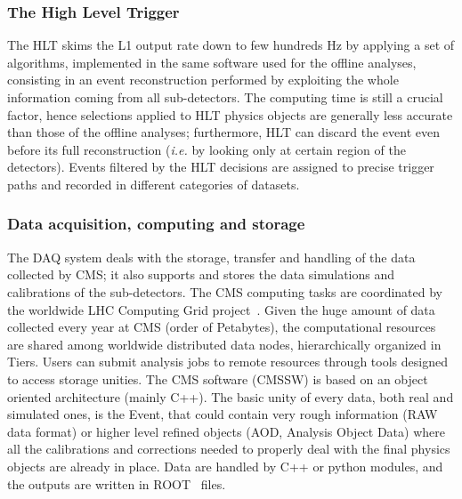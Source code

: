 \subsubsection{The High Level Trigger}
The HLT skims the L1 output rate down to few hundreds Hz by applying a set of algorithms, implemented in the same software used for the offline analyses, consisting in an event reconstruction performed by exploiting the whole information coming from all sub-detectors. The computing time is still a crucial factor, hence selections applied to HLT physics objects are generally less accurate than those of the offline analyses; furthermore, HLT can discard the event even before its full reconstruction (\textit{i.e.} by looking only at certain region of the detectors). Events filtered by the HLT decisions are assigned to precise trigger paths and recorded in different categories of datasets.

\subsubsection{Data acquisition, computing and storage}
The DAQ system deals with the storage, transfer and handling of the data collected by CMS; it also supports and stores the data simulations and calibrations of the sub-detectors. 
The CMS computing tasks are coordinated by the worldwide LHC Computing Grid project~\cite{2007CoPhC.177..219S}. Given the huge amount of data collected every year at CMS (order of Petabytes), the computational resources are shared among worldwide distributed data nodes, hierarchically organized in Tiers. Users can submit analysis jobs to remote resources through tools designed to access storage unities. 
The CMS software (CMSSW) is based on an object oriented architecture (mainly C++). The basic unity of every data, both real and simulated ones, is the Event, that could contain very rough information (RAW data format) or higher level refined objects (AOD, Analysis Object Data) where all the calibrations and corrections needed to properly deal with the final physics objects are already in place. Data are handled by C++ or python modules, and the outputs are written in ROOT~\cite{Brun:1997pa} files.

